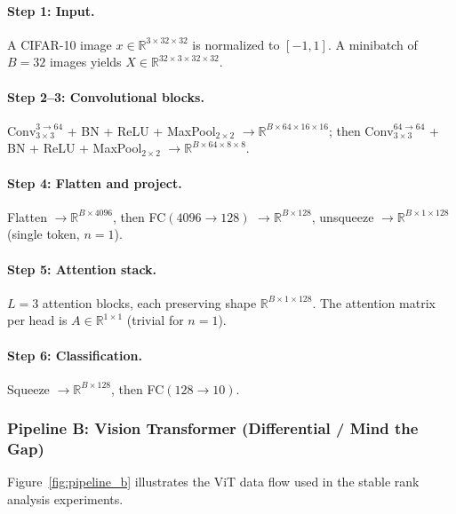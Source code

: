 \documentclass[12pt, a4paper]{article}
\begin{document}
\paragraph{Step 1: Input.}
A CIFAR-10 image $x \in \mathbb{R}^{3 \times 32 \times 32}$ is
normalized to $[-1, 1]$. A minibatch of $B = 32$ images yields
$X \in \mathbb{R}^{32 \times 3 \times 32 \times 32}$.

\paragraph{Step 2--3: Convolutional blocks.}
$\text{Conv}_{3\times3}^{3 \to 64}$ + BN + ReLU + MaxPool$_{2\times2}$
$\to \mathbb{R}^{B \times 64 \times 16 \times 16}$;
then $\text{Conv}_{3\times3}^{64 \to 64}$ + BN + ReLU +
MaxPool$_{2\times2}$
$\to \mathbb{R}^{B \times 64 \times 8 \times 8}$.

\paragraph{Step 4: Flatten and project.}
Flatten $\to \mathbb{R}^{B \times 4096}$, then FC$(4096 \to 128)$
$\to \mathbb{R}^{B \times 128}$, unsqueeze $\to
\mathbb{R}^{B \times 1 \times 128}$ (single token, $n=1$).

\paragraph{Step 5: Attention stack.}
$L = 3$ attention blocks, each preserving shape
$\mathbb{R}^{B \times 1 \times 128}$. The attention matrix per head is
$A \in \mathbb{R}^{1 \times 1}$ (trivial for $n=1$).

\paragraph{Step 6: Classification.}
Squeeze $\to \mathbb{R}^{B \times 128}$, then FC$(128 \to 10)$.

\subsubsection{Pipeline B: Vision Transformer (Differential / Mind the Gap)}

Figure~\ref{fig:pipeline_b} illustrates the ViT data flow used in the
stable rank analysis experiments.
\end{document}
